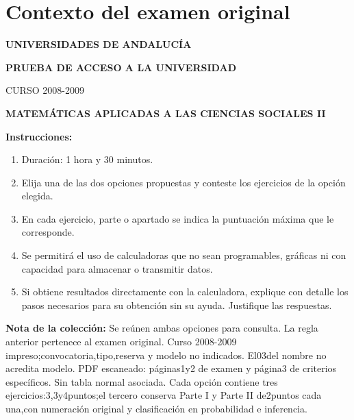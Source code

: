 \section*{Contexto del examen original}
\textbf{UNIVERSIDADES DE ANDALUCÍA}\par
\textbf{PRUEBA DE ACCESO A LA UNIVERSIDAD}\par
CURSO 2008-2009\par
\textbf{MATEMÁTICAS APLICADAS A LAS CIENCIAS SOCIALES II}

\textbf{Instrucciones:}
\begin{enumerate}[label=\textbf{\alph*)}]
  \item Duración: 1 hora y 30 minutos.
  \item Elija una de las dos opciones propuestas y conteste los ejercicios de la opción elegida.
  \item En cada ejercicio, parte o apartado se indica la puntuación máxima que le corresponde.
  \item Se permitirá el uso de calculadoras que no sean programables, gráficas ni con capacidad para almacenar o transmitir datos.
  \item Si obtiene resultados directamente con la calculadora, explique con detalle los pasos necesarios para su obtención sin su ayuda. Justifique las respuestas.
\end{enumerate}
\noindent\textbf{Nota de la colección:} Se reúnen ambas opciones para consulta. La regla anterior pertenece al examen original. Curso 2008-2009 impreso;convocatoria,tipo,reserva y modelo no indicados. El03del nombre no acredita modelo. PDF escaneado: páginas1y2 de examen y página3 de criterios específicos. Sin tabla normal asociada. Cada opción contiene tres ejercicios:3,3y4puntos;el tercero conserva Parte I y Parte II de2puntos cada una,con numeración original y clasificación en probabilidad e inferencia.
\par\medskip
